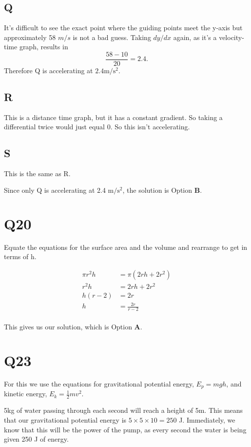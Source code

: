 \documentclass[11pt]{article}
\begin{document}
\subsection*{Q}
It's difficult to see the exact point where the guiding points meet the y-axis but approximately 58 $m/s$ is not a bad guess.  Taking $dy/dx$ again, as it's a velocity-time graph, results in 
\begin{equation*}
\frac{58-10}{20}=2.4.
\end{equation*}
Therefore Q is accelerating at $2.4 \mathrm{m/s^{2}}$.

\subsection*{R}
This is a distance time graph, but it has a constant gradient.  So taking a differential twice would just equal 0.  So this isn't accelerating.

\subsection*{S}
This is the same as R.

Since only Q is accelerating at 2.4 $\mathrm{m/s^2}$, the solution is Option \textbf{B}.

\section*{Q20}
Equate the equations for the surface area and the volume and rearrange to get in terms of h.

\begin{equation*}
\begin{aligned}
\pi r^2 h &= \pi (2rh + 2r^2)\\
r^2h &= 2rh + 2r^2\\
h(r-2) &= 2r\\
h &= \frac{2r}{r-2}\\
\end{aligned}
\end{equation*}

This gives us our solution, which is Option \textbf{A}.


\section*{Q23}
For this we use the equations for gravitational potential energy, $E_p = mgh$, and kinetic energy, $E_k = \frac{1}{2}mv^2$.

5kg of water passing through each second will reach a height of 5m.  This means that our gravitational potential energy is $5\times5\times10 = 250$ J.  Immediately, we know that this will be the power of the pump, as every second the water is being given 250 J of energy.  
\end{document}
